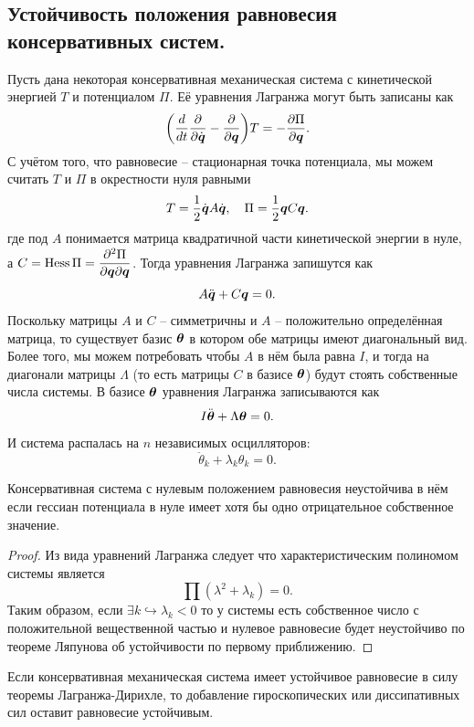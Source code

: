 \subsection{Устойчивость положения равновесия консервативных систем.}
Пусть дана некоторая консервативная механическая система с кинетической энергией $T$ и потенциалом $\Pi$.
Её уравнения Лагранжа могут быть записаны как
\[
    \biggr(\dfrac{d}{dt}\dfrac{\partial}{\partial \dot{\boldsymbol{q}}} - \dfrac{\partial}{\partial \boldsymbol{q}}\biggr)T = -\dfrac{\partial \Pi}{\partial \boldsymbol{q}}.
\]
С учётом того, что равновесие -- стационарная точка потенциала, мы можем считать $T$ и $\Pi$ в окрестности нуля равными
\[
    T = \dfrac{1}{2}\dot{\boldsymbol{q}}A\dot{\boldsymbol{q}}, \quad \Pi = \dfrac{1}{2}\boldsymbol{q}C\boldsymbol{q}.
\]
где под $A$ понимается матрица квадратичной части кинетической энергии в нуле, а $C = \operatorname{Hess} \Pi = \dfrac{\partial^2 \Pi}{\partial \boldsymbol{q}\partial \boldsymbol{q}}$.
Тогда уравнения Лагранжа запишутся как
\[
    A\ddot{\boldsymbol{q}} + C\boldsymbol{q} = 0.
\]
Поскольку матрицы $A$ и $C$ -- симметричны и $A$ -- положительно определённая матрица, то существует базис $\boldsymbol{\theta}$ в котором обе матрицы имеют диагональный вид.
Более того, мы можем потребовать чтобы $A$ в нём была равна $I$, и тогда на диагонали матрицы $\Lambda$ (то есть матрицы $C$ в базисе $\boldsymbol{\theta}$) будут стоять собственные числа системы.
В базисе $\boldsymbol{\theta}$ уравнения Лагранжа записываются как
\[
    I\ddot{\boldsymbol{\theta}} + \Lambda \boldsymbol{\theta} = 0.
\]
И система распалась на $n$ независимых осцилляторов:
\[
    \ddot{\theta}_k + \lambda_k \theta_k = 0.
\]
\begin{theorem}
    Консервативная система с нулевым положением равновесия неустойчива в нём если гессиан потенциала в нуле имеет хотя бы одно отрицательное собственное значение.
\end{theorem}
\begin{proof}
    Из вида уравнений Лагранжа следует что характеристическим полиномом системы является
    \[
        \prod (\lambda^2 + \lambda_k) = 0.
    \]
    Таким образом, если $\exists k \hookrightarrow \lambda_k < 0$ то у системы есть собственное число с положительной вещественной частью и нулевое равновесие будет неустойчиво по теореме Ляпунова об устойчивости по первому приближению.
\end{proof}
\begin{theorem}
    Если консервативная механическая система имеет устойчивое равновесие в силу теоремы Лагранжа-Дирихле, то добавление гироскопических или диссипативных сил оставит равновесие устойчивым.
\end{theorem}
